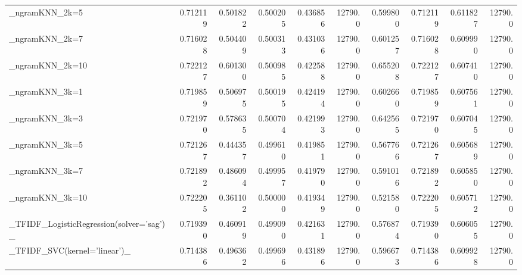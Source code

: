 \begin{tabular}{lrrrrrrrrr}
\_ngramKNN\_2k=5                                     &  0.712119 &         0.501822 &      0.500205 &        0.436856 &        12790.0 &            0.599800 &         0.712119 &           0.611827 &           12790.0 \\
\_ngramKNN\_2k=7                                     &  0.716028 &         0.504409 &      0.500313 &        0.431036 &        12790.0 &            0.601257 &         0.716028 &           0.609990 &           12790.0 \\
\_ngramKNN\_2k=10                                    &  0.722127 &         0.601300 &      0.500985 &        0.422588 &        12790.0 &            0.655208 &         0.722127 &           0.607410 &           12790.0 \\
\_ngramKNN\_3k=1                                     &  0.719859 &         0.506975 &      0.500195 &        0.424194 &        12790.0 &            0.602660 &         0.719859 &           0.607561 &           12790.0 \\
\_ngramKNN\_3k=3                                     &  0.721970 &         0.578635 &      0.500704 &        0.421993 &        12790.0 &            0.642565 &         0.721970 &           0.607045 &           12790.0 \\
\_ngramKNN\_3k=5                                     &  0.721267 &         0.444357 &      0.499610 &        0.419851 &        12790.0 &            0.567766 &         0.721267 &           0.605689 &           12790.0 \\
\_ngramKNN\_3k=7                                     &  0.721892 &         0.486094 &      0.499957 &        0.419790 &        12790.0 &            0.591016 &         0.721892 &           0.605850 &           12790.0 \\
\_ngramKNN\_3k=10                                    &  0.722205 &         0.361102 &      0.500000 &        0.419349 &        12790.0 &            0.521580 &         0.722205 &           0.605712 &           12790.0 \\
\_TFIDF\_LogisticRegression(solver='sag')\_           &  0.719390 &         0.460919 &      0.499090 &        0.421631 &        12790.0 &            0.576874 &         0.719390 &           0.606055 &           12790.0 \\
\_TFIDF\_SVC(kernel='linear')\_                       &  0.714386 &         0.496362 &      0.499696 &        0.431896 &        12790.0 &            0.596673 &         0.714386 &           0.609928 &           12790.0 \\

\end{tabular}
